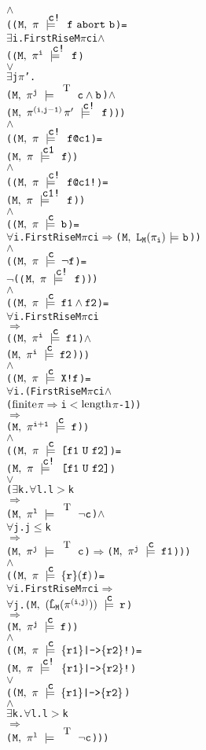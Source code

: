 \documentclass{llncs}
\makeatletter
\newcommand{\And}{\(\wedge\)}
\newcommand{\Or}{\(\vee\)}
\newcommand{\Imp}{\(\Rightarrow\)}
\newcommand{\Not}{\(\neg\)}
\newcommand{\Forall}{\(\forall\)}
\newcommand{\Exists}{\(\exists\)}
\newcommand{\IsFinitePath}{\({\rm{finite}}\)}
\newcommand{\PathLength}{\({\rm{length}}\)}
\newcommand{\pathCat}[2]{#1\hspace*{0.5mm}#2}
\newcommand{\Leq}{\(\leq\)}
\newcommand{\Le}{\(<\)}
\newcommand{\Ge}{\(>\)}
\newcommand{\T}{\texttt{\small\rm{T}}}
\renewcommand{\Pi}{\(\pi\)}
\newcommand{\BSem}[3]{(\(\tt#1,~#2~{\models}~#3\))}
\newcommand{\SSem}[4]{(\(\tt{#1,~#2~\models^{\hspace*{-2.3mm}\raisebox{1mm}{\tt#3}}~#4}\))}
\newcommand{\FSem}[4]{(\(\tt{#1,~#2~\models^{\hspace*{-2.3mm}\raisebox{1mm}{\tt#3}}~#4}\))}
\newcommand{\FBool}[1]{#1}
\newcommand{\bNot}[1]{\neg#1}
\newcommand{\fNot}[1]{\neg#1}
\newcommand{\weakClock}[1]{#1}
\newcommand{\strongClock}[1]{#1!}
\newcommand{\restN}[2]{#1^{#2}}
\newcommand{\pathEl}[2]{#1_{#2}}
\newcommand{\pathSeg}[2]{#1^{#2}}
\newcommand{\lHat}[1]{\hat{\texttt{L}}_{#1}}
\newcommand{\lNoHat}[1]{{\texttt{L}}_{#1}}
\newcommand{\bAnd}[2]{#1\wedge#2}
\newcommand{\fAnd}[2]{#1 \wedge #2}
\newcommand{\fNext}[1]{\texttt{X!}#1}
\newcommand{\fUntil}[2]{\texttt{[}#1~\texttt{U}~#2\texttt{]}}
\newcommand{\fSuffixImp}[2]{\{#1\}(#2)}
\newcommand{\fStrongImp}[2]{\{#1\}\texttt{|->}\{#2\}\texttt{!}}
\newcommand{\fWeakImp}[2]{\{#1\}\texttt{|->}\{#2\}}
\newcommand{\fAbort}[2]{#1~\texttt{abort}~#2}
\newcommand{\fWeakClock}[2]{#1\texttt{@}#2}
\newcommand{\fStrongClock}[2]{#1\texttt{@}#2\texttt{!}}
\makeatother
\begin{document}
{\begin{alltt}
    {\And}
    ({\FSem{M}{{\pi}}{{\strongClock{c}}}{\fAbort{f}{b}}} =
      {\Exists}i. FirstRise M {\Pi} c i {\And}
          ({\FSem{M}{\restN{{\pi}}{i}}{{\strongClock{c}}}{f }}
           {\Or}
           {\Exists}j {\Pi}'. 
             {\FSem{M}{\restN{{\pi}}{j}}{\weakClock{\T}}{{\FBool{\bAnd{c}{b}}}}} {\And} 
             {\FSem{M}{\pathCat{\pathSeg{\pi}{(i,j-1)}}{{\pi}'}}{{\strongClock{c}}}{f}}))
    {\And}
    ({\FSem{M}{{\pi}}{{\strongClock{c}}}{\fWeakClock{f}{c1}}} =   
      {\FSem{M}{{\pi}}{{\weakClock{c1}}}{f)}}
    {\And}
    ({\FSem{M}{{\pi}}{{\strongClock{c}}}{\fStrongClock{f}{c1}}} =   
      {\FSem{M}{{\pi}}{{\strongClock{c1}}}{f}})
    {\And}
    ({\FSem{M}{{\pi}}{{\weakClock{c}}}{{\FBool{b}}}} = 
      {\Forall}i. FirstRise M {\Pi} c i {\Imp} {\BSem{M}{\lNoHat{M}(\pathEl{{\pi}}{i})}{b}})
    {\And}
    ({\FSem{M}{{\pi}}{{\weakClock{c}}}{\fNot{f}}} = 
      {\Not}({\FSem{M}{{\pi}}{{\strongClock{c}}}{f}})) 
    {\And}
    ({\FSem{M}{{\pi}}{{\weakClock{c}}}{\fAnd{f1}{f2}}} = 
      {\Forall}i. FirstRise M {\Pi} c i
          {\Imp}
          ({\FSem{M}{\restN{{\pi}}{i}}{{\weakClock{c}}}{f1}} {\And}
           {\FSem{M}{\restN{{\pi}}{i}}{{\weakClock{c}}}{f2}}))
    {\And}
    ({\FSem{M}{{\pi}}{{\weakClock{c}}}{\fNext{f}}} = 
      {\Forall}i. (FirstRise M {\Pi} c i {\And}
          ({\IsFinitePath} {\Pi} {\Imp} i {\Le} \PathLength {\Pi} - 1))
           {\Imp}
           {\FSem{M}{\restN{{\pi}}{i+1}}{{\weakClock{c}}}{f}})
    {\And}
    ({\FSem{M}{{\pi}}{{\weakClock{c}}}{\fUntil{f1}{f2}}} = 
      {\FSem{M}{{\pi}}{{\strongClock{c}}}{\fUntil{f1}{f2}}}  
      {\Or}
      ({\Exists}k. {\Forall}l. l {\Ge} k
               {\Imp}
               {\FSem{M}{\restN{{\pi}}{l}}{\weakClock{\T}}{{\FBool{\bNot{c}}}}}   {\And} 
               {\Forall}j. j {\Leq} k 
                   {\Imp}
                   {\FSem{M}{\restN{{\pi}}{j}}{\weakClock{\T}}{{\FBool{c}}}} {\Imp} {\FSem{M}{\restN{{\pi}}{j}}{{\weakClock{c}}}{f1}}))
    {\And}
    ({\FSem{M}{{\pi}}{{\weakClock{c}}}{\fSuffixImp{r}{f}}} = 
      {\Forall}i. FirstRise M {\Pi} c i {\Imp}
          {\Forall}j. \SSem{M}{(\lHat{M} (\pathSeg{\pi}{(i,j)}))}{c}{r}
              {\Imp}
              {\FSem{M}{\restN{{\pi}}{j}}{{\weakClock{c}}}{f}})
    {\And}
    ({\FSem{M}{{\pi}}{{\weakClock{c}}}{\fStrongImp{r1}{r2}}} = 
      {\FSem{M}{{\pi}}{{\strongClock{c}}}{\fStrongImp{r1}{r2}}}  
      {\Or}
      ({\FSem{M}{{\pi}}{{\weakClock{c}}}{\fWeakImp{r1}{r2}}} 
       {\And}
       {\Exists}k. {\Forall}l. l {\Ge} k 
               {\Imp} 
               {\FSem{M}{\restN{{\pi}}{l}}{\weakClock{\T}}{{\FBool{\bNot{c}}}}}))

\end{alltt}}
\end{document}
